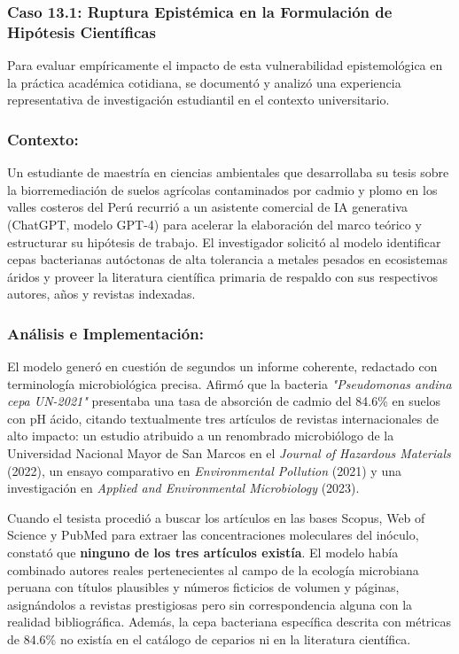 \subsubsection{Caso 13.1: Ruptura Epistémica en la Formulación de Hipótesis Científicas}

Para evaluar empíricamente el impacto de esta vulnerabilidad epistemológica en la práctica académica cotidiana, se documentó y analizó una experiencia representativa de investigación estudiantil en el contexto universitario.

\subsubsection*{Contexto:}
Un estudiante de maestría en ciencias ambientales que desarrollaba su tesis sobre la biorremediación de suelos agrícolas contaminados por cadmio y plomo en los valles costeros del Perú recurrió a un asistente comercial de IA generativa (ChatGPT, modelo GPT-4) para acelerar la elaboración del marco teórico y estructurar su hipótesis de trabajo. El investigador solicitó al modelo identificar cepas bacterianas autóctonas de alta tolerancia a metales pesados en ecosistemas áridos y proveer la literatura científica primaria de respaldo con sus respectivos autores, años y revistas indexadas.

\subsubsection*{Análisis e Implementación:}
El modelo generó en cuestión de segundos un informe coherente, redactado con terminología microbiológica precisa. Afirmó que la bacteria \textit{"Pseudomonas andina cepa UN-2021"} presentaba una tasa de absorción de cadmio del 84.6\% en suelos con pH ácido, citando textualmente tres artículos de revistas internacionales de alto impacto: un estudio atribuido a un renombrado microbiólogo de la Universidad Nacional Mayor de San Marcos en el \textit{Journal of Hazardous Materials} (2022), un ensayo comparativo en \textit{Environmental Pollution} (2021) y una investigación en \textit{Applied and Environmental Microbiology} (2023).

Cuando el tesista procedió a buscar los artículos en las bases Scopus, Web of Science y PubMed para extraer las concentraciones moleculares del inóculo, constató que \textbf{ninguno de los tres artículos existía}. El modelo había combinado autores reales pertenecientes al campo de la ecología microbiana peruana con títulos plausibles y números ficticios de volumen y páginas, asignándolos a revistas prestigiosas pero sin correspondencia alguna con la realidad bibliográfica. Además, la cepa bacteriana específica descrita con métricas de 84.6\% no existía en el catálogo de ceparios ni en la literatura científica.

